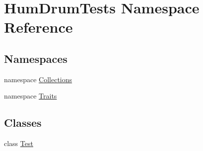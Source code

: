 \hypertarget{namespaceHumDrumTests}{}\section{Hum\+Drum\+Tests Namespace Reference}
\label{namespaceHumDrumTests}
\subsection*{Namespaces}
\begin{DoxyCompactItemize}
\item 
namespace \hyperlink{namespaceHumDrumTests_1_1Collections}{Collections}
\item 
namespace \hyperlink{namespaceHumDrumTests_1_1Traits}{Traits}
\end{DoxyCompactItemize}
\subsection*{Classes}
\begin{DoxyCompactItemize}
\item 
class \hyperlink{classHumDrumTests_1_1Test}{Test}
\end{DoxyCompactItemize}
